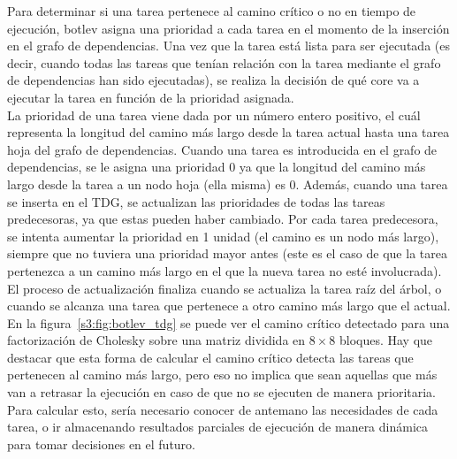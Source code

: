 Para determinar si una tarea pertenece al camino crítico o no en tiempo de
ejecución, botlev asigna una prioridad a cada tarea en el momento de la
inserción en el grafo de dependencias. Una vez que la tarea está lista para
ser ejecutada (es decir, cuando todas las tareas que tenían relación con la
tarea mediante el grafo de dependencias han sido ejecutadas), se realiza la
decisión de qué core va a ejecutar la tarea en función de la prioridad
asignada.\\
La prioridad de una tarea viene dada por un número entero positivo, el cuál
representa la longitud del camino más largo desde la tarea actual hasta una
tarea hoja del grafo de dependencias. Cuando una tarea es introducida en el
grafo de dependencias, se le asigna una prioridad 0 ya que la longitud del
camino más largo desde la tarea a un nodo hoja (ella misma) es 0. Además,
cuando una tarea se inserta en el TDG, se actualizan las prioridades de
todas las tareas predecesoras, ya que estas pueden haber cambiado. Por cada
tarea predecesora, se intenta aumentar la prioridad en 1 unidad (el camino
es un nodo más largo), siempre que no tuviera una prioridad mayor antes
(este es el caso de que la tarea pertenezca a un camino más largo en el que
la nueva tarea no esté involucrada). El proceso de actualización finaliza
cuando se actualiza la tarea raíz del árbol, o cuando se alcanza una tarea
que pertenece a otro camino más largo que el actual. En la
figura~\ref{s3:fig:botlev_tdg} se puede ver el camino crítico detectado
para una factorización de Cholesky sobre una matriz dividida en $8\times8$
bloques. Hay que destacar que esta forma de calcular el camino crítico
detecta las tareas que pertenecen al camino más largo, pero eso no implica
que sean aquellas que más van a retrasar la ejecución en caso de que no se
ejecuten de manera prioritaria. Para calcular esto, sería necesario conocer
de antemano las necesidades de cada tarea, o ir almacenando resultados
parciales de ejecución de manera dinámica para tomar decisiones en el
futuro.
